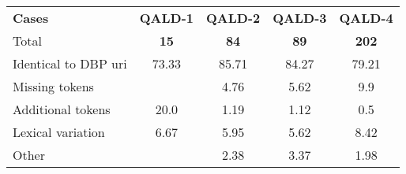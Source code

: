 {\centering
\begin{tabular}{l|c|c|c|c}
\textbf{Cases}  & \textbf{QALD-1} & \textbf{QALD-2} & \textbf{QALD-3} & \textbf{QALD-4} \\
\hspace{2cm}Total      & \textbf{15}     & \textbf{84}     & \textbf{89}     & \textbf{202} \\ \hline \hline
Identical to DBP uri   & 73.33           & 85.71           & 84.27           & 79.21           \\ \hline
Missing tokens         &                 & 4.76            & 5.62            & 9.9             \\ \hline
Additional tokens      & 20.0            & 1.19            & 1.12            & 0.5             \\ \hline
Lexical variation      & 6.67            & 5.95            & 5.62            & 8.42            \\ \hline
Other                  &                 & 2.38            & 3.37            & 1.98            \\ \hline
\end{tabular}
}
